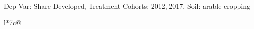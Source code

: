 \begin{table}[H]
\captionlistentry[table]{}
\label{table:beaver_land_class_DVis_land_class_3_SCg12_SSAC}
\scriptsize %
Dep Var: Share Developed, Treatment Cohorts: 2012, 2017, Soil: arable cropping \\
\begin{threeparttable}
\begin{tabulary}{\textwidth}{l*{7}{c}@{}}
\toprule \toprule
\noalign{\smallskip}
\noalign{\smallskip}
\midrule \bottomrule
\end{tabulary}
\medskip
\end{threeparttable}
\end{table}
